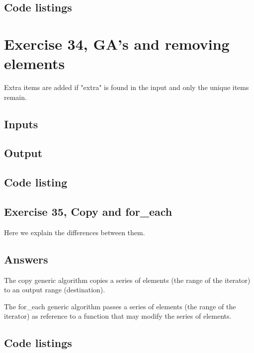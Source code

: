 \documentclass[11pt]{article}
\begin{document}
\subsection*{Code listings}








\section*{Exercise 34, GA's and removing elements}
Extra items are added if "extra" is found in the input and only the unique items remain.

\subsection*{Inputs}



\subsection*{Output}


\subsection*{Code listing}


\subsection*{Exercise 35, Copy and for\_each}
Here we explain the differences between them.

\subsection*{Answers}
The copy generic algorithm copies a series of elements (the range of
the iterator) to an output range (destination).

The for\_each generic algorithm passes a series of elements (the range
of the iterator) as reference to a function that may modify the
series of elements.

\subsection*{Code listings}


\end{document}
